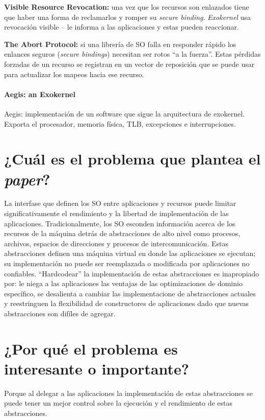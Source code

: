 \textbf{Visible Resource Revocation:} una vez que los recursos son enlazados tiene que haber una forma de reclamarlos y romper su \textit{secure binding}. \textit{Exokernel} usa revocación visible -- le informa a las aplicaciones y estas pueden reaccionar. 

\textbf{The Abort Protocol:} si una librería de SO falla en responder rápido los enlances seguros (\textit{secure bindings}) necesitan ser rotos ``a la fuerza''. Estas pérdidas forzadas de un recurso se registran en un vector de reposición que se puede usar para actualizar los mapeos hacia ese recurso.

\paragraph{\textnormal{\textbf{Aegis: an Exokernel}}}
Aegis: implementación de un software que sigue la arquitectura de exokernel. Exporta el procesador, memoria física, TLB, excepciones e interrupciones.
 

\section{¿Cuál es el problema que plantea el \textit{paper}?}
La interfase que definen los SO entre aplicaciones y recursos puede limitar significativamente el rendimiento y la libertad de implementación de las aplicaciones. Tradicionalmente, los SO esconden información acerca de los recursos de la máquina detrás de abstracciones de alto nivel como procesos, archivos, espacios de direcciones y procesos de intercomunicación. Estas abstracciones definen una máquina virtual en donde las aplicaciones se ejecutan; su implementación no puede ser reemplazada o modificada por aplicaciones no confiables. ``Hardcodear'' la implementación de estas abstracciones es inapropiado por: le niega a las aplicaciones las ventajas de las optimizaciones de dominio específico, se desalienta a cambiar las implementacione de abstracciones actuales y reestringuen la flexibilidad de constructores de aplicaciones dado que nuevas abstracciones son difíles de agregar.

\section{¿Por qué el problema es interesante o importante?}
Porque al delegar a las aplicaciones la implementación de estas abstracciones se puede tener un mejor control sobre la ejecución y el rendimiento de estas abstracciones.  

